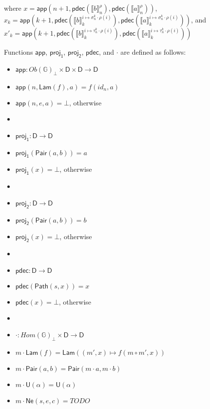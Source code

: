 \documentclass{amsart}
\theoremstyle{definition}
\theoremstyle{remark}
\newcommand{\D}{\mathsf{D}}
\newcommand{\bbG}{\mathbb{G}}
\numberwithin{table}{section}
\begin{document}
\begin{itemize}
    \indent where $x = \mathsf{app}(n + 1, \mathsf{pdec}(\llbracket b \rrbracket^\rho_n), \mathsf{pdec}(\llbracket a \rrbracket^\rho_n))$, \\
    \indent \indent $x_k = \mathsf{app}(k + 1, \mathsf{pdec}(\llbracket b \rrbracket^{i \mapsto \sigma^k_n \cdot \rho(i)}_k), \mathsf{pdec}(\llbracket a \rrbracket^{i \mapsto \sigma^k_n \cdot \rho(i)}_k))$, and \\
    \indent \indent $x'_k = \mathsf{app}(k + 1, \mathsf{pdec}(\llbracket b \rrbracket^{i \mapsto \tau^k_n \cdot \rho(i)}_k), \mathsf{pdec}(\llbracket a \rrbracket^{i \mapsto \tau^k_n \cdot \rho(i)}_k))$
\end{itemize}

Functions $\mathsf{app}$, $\mathsf{proj_1}$, $\mathsf{proj_2}$, $\mathsf{pdec}$, and $\cdot$ are defined as follows:
\begin{itemize}
\item[] $\mathsf{app} : Ob(\bbG)_\bot \times \D \times \D \to \D$
\item[] $\mathsf{app}(n,\mathsf{Lam}(f),a) = f(id_n,a)$
\item[] $\mathsf{app}(n,e,a) = \bot$, otherwise
\item[]
\item[] $\mathsf{proj_1} : \D \to \D$
\item[] $\mathsf{proj_1}(\mathsf{Pair}(a,b)) = a$
\item[] $\mathsf{proj_1}(x) = \bot$, otherwise
\item[]
\item[] $\mathsf{proj_2} : \D \to \D$
\item[] $\mathsf{proj_2}(\mathsf{Pair}(a,b)) = b$
\item[] $\mathsf{proj_2}(x) = \bot$, otherwise
\item[]
\item[] $\mathsf{pdec} : \D \to \D$
\item[] $\mathsf{pdec}(\mathsf{Path}(s,x)) = x$
\item[] $\mathsf{pdec}(x) = \bot$, otherwise
\item[]
\item[] $\cdot : Hom(\bbG)_\bot \times \D \to \D$
\item[] $m \cdot \mathsf{Lam}(f) = \mathsf{Lam}((m',x) \mapsto f(m \circ m', x))$
\item[] $m \cdot \mathsf{Pair}(a, b) = \mathsf{Pair}(m \cdot a, m \cdot b)$
\item[] $m \cdot \mathsf{U}(\alpha) = \mathsf{U}(\alpha)$
\item[] $m \cdot \mathsf{Ne}(s,e,c) = TODO$

\end{itemize}
\end{document}

